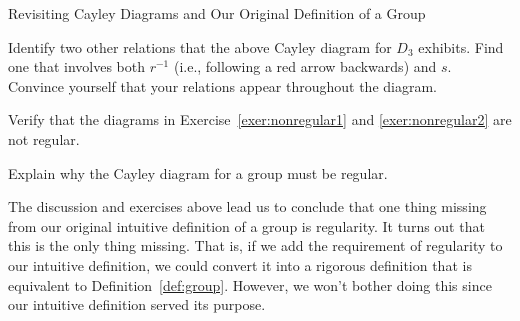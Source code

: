 \begin{section}{Revisiting Cayley Diagrams and Our Original Definition of a Group}
\begin{exercise}
Identify two other relations that the above Cayley diagram for \(D_3\) exhibits.  Find one that involves both \(r^{-1}\) (i.e., following a red arrow backwards) and \(s\).  Convince yourself that your relations appear throughout the diagram.
\end{exercise}

\begin{exercise}
Verify that the diagrams in Exercise~\ref{exer:nonregular1} and \ref{exer:nonregular2} are not regular.
\end{exercise}

\begin{problem}
Explain why the Cayley diagram for a group must be regular.
\end{problem}

The discussion and exercises above lead us to conclude that one thing missing from our original intuitive definition of a group is regularity.  It turns out that this is the only thing missing.  That is, if we add the requirement of regularity to our intuitive definition, we could convert it into a rigorous definition that is equivalent to Definition~\ref{def:group}.  However, we won't bother doing this since our intuitive definition served its purpose.

\end{section}

